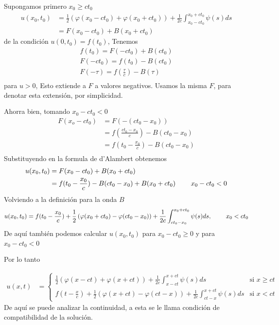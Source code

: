 \documentclass[11pt]{book}
\theoremstyle{plain}
\theoremstyle{definition}
\begin{document}
Supongamos primero $x_0\geq ct_0$
\begin{align*}
    u(x_0,t_0) & = \frac{1}{2}\left( \varphi(x_0 - ct_0) + \varphi(x_0 + ct_0)\right) +\frac{1}{2c}\int_{x_0-ct_0}^{x_0+ct_0}\psi(s)ds\\
    &=F(x_0-ct_0) + B(x_0+ct_0)
\end{align*}
\setcounter{equation}{0}
de la condición $u(0,t_0) = f(t_0)$, Tenemos
\begin{align*}
    f(t_0) = F(-ct_0) + B (ct_{0})\\
    F(-ct_0) = f(t_0) - B (ct_{0})\\
    F(-\tau) =  f(\frac{\tau}{c}) - B(\tau)\\
\end{align*}
para $u>0$, Esto extiende a $F$ a valores negativos. Usamos la misma $F$, para denotar esta extensión, por simplicidad.

Ahorra bien, tomando $x_0-ct_0<0$ 
\begin{align*}
    F(x_o-ct_0) &= F(-(ct_0 - x_0))\\
    &=  f(\frac{ct_0 - x_0}{c}) - B(ct_0 - x_0)\\
    &=  f(t_0 - \frac{x_0}{c}) - B(ct_0 - x_0)\\
\end{align*}
Substituyendo en la formula de d'Alambert obtenemos
\begin{align*}
    u(x_0,t_0) &=F(x_0-ct_0) + B(x_0+ct_0)\\
    &= f(t_0 - \frac{x_0}{c}) - B(ct_0 - x_0) + B(x_0+ct_0) \hspace{8mm} x_0-ct_0<0\\
\end{align*}
Volviendo a la definición para la onda $B$
\begin{align*}
    u(x_0,t_0) &= f(t_0 - \frac{x_0}{c}) +\frac{1}{2}\left(\varphi(x_0+ct_0)-\varphi(ct_0 - x_0)\right)
    +\frac{1}{2c}\int_{ct_0 -x_0}^{x_0+ct_0}\psi(s)ds,\hspace{8mm} x_0<ct_0\\
\end{align*}
De aquí también podemos calcular $u(x_0,t_0)$ para $x_0-ct_0\geq0$ y para $x_0-ct_0<0$

Por lo tanto

\begin{align}
    u(x,t) &= 
\begin{cases} 
\frac{1}{2}\left(\varphi(x-ct)+\varphi(x+ct)\right)
    +\frac{1}{2c}\int_{x-ct}^{x+ct}\psi(s)ds & \text{si }  x\geq ct\\
 f(t - \frac{x}{c}) +\frac{1}{2}\left(\varphi(x+ct)-\varphi(ct - x)\right)
    +\frac{1}{2c}\int_{ct -x}^{x+ct}\psi(s)ds & \text{si } x<ct
\end{cases} 
\end{align} 
De aquí se puede analizar la continuidad, a esta se le llama condición de compatibilidad de la solución. 
\newpage
\end{document}
